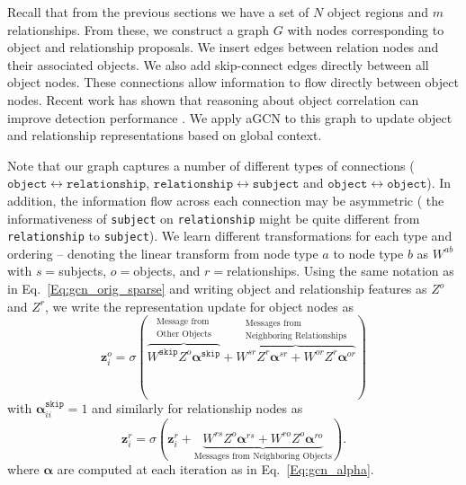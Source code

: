  Recall that from the previous sections we have a set of $N$ object regions and $m$ relationships. From these, we construct a graph $G$ with nodes corresponding to object and relationship proposals. We insert edges between relation nodes and their associated objects. We also add skip-connect edges directly between all object nodes. These connections allow information to flow directly between object nodes. Recent work has shown that reasoning about object correlation can improve detection performance \cite{hu2018relation}.
We apply aGCN to this graph to update object and relationship representations based on global context.

Note that our graph captures a number of different types of connections (\ie $\mathtt{object}\leftrightarrow\mathtt{relationship}$, $\mathtt{relationship}\leftrightarrow\mathtt{subject}$ and $ \mathtt{object}\leftrightarrow\mathtt{object}$). In addition, the information flow across each connection may be asymmetric ( the informativeness of \texttt{subject} on \texttt{relationship} might be quite different from \texttt{relationship} to \texttt{subject}). We learn different transformations for each type and ordering -- denoting the linear transform from node type $a$ to node type $b$ as $W^{ab}$ with $s{=}$subjects, $o{=}$objects, and $r{=}$relationships.
Using the same notation as in Eq.~\ref{Eq:gcn_orig_sparse} and writing object and relationship features as $Z^o$ and $Z^r$, we write the representation update for object nodes as
%
\begin{equation}
\bm{z}_{i}^o = \sigma ( 
\overbrace{W^{\mathtt{skip}} Z^o \bm{\alpha}^{\mathtt{skip}}}^{\substack{\text{Message from}\\ \text{Other Objects}}} + 
\overbrace{W^{sr} Z^r\bm{\alpha}^{sr} + W^{or} Z^r\bm{\alpha}^{or}}^{\substack{\text{Messages from}\\ \text{Neighboring Relationships}}}) 
\end{equation}
%
with $\bm{\alpha}^{\mathtt{skip}}_{ii}{=}1$ and similarly for relationship nodes as
%
\begin{equation}
\bm{z}_{i}^r = \sigma (\bm{z}_{i}^r + \underbrace{W^{rs} Z^{o} \bm{\alpha}^{rs} +  W^{ro} Z^{o} \bm{\alpha}^{ro}}_{\text{Messages from Neighboring Objects}}).
\end{equation}
where $\bm{\alpha}$ are computed at each iteration as in Eq.~\ref{Eq:gcn_alpha}.

